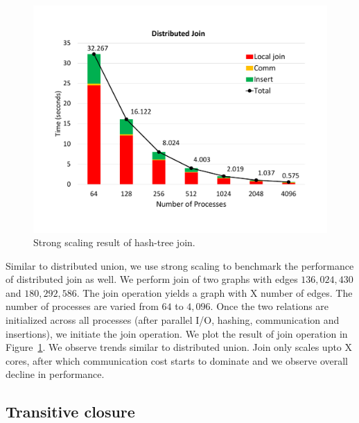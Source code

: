 \begin{figure}[h]
	\includegraphics[width=\columnwidth]{results/join.pdf}
	\caption{Strong scaling result of hash-tree join.}
	\label{fig:dist_join}
\end{figure}



Similar to distributed union, we use strong scaling to benchmark the performance of distributed join as well.
We perform join of two graphs with edges $136,024,430$ and $180,292,586$. The join operation yields a graph with X number of edges.
The number of processes are varied from $64$ to $4,096$. 
Once the two relations are initialized across all processes (after parallel I/O, hashing, communication and insertions), we initiate the join operation. 
We plot the result of join operation in Figure~\ref{fig:dist_join}. We observe trends similar to distributed union.
Join only scales upto X cores, after which communication cost starts to dominate and we observe overall decline in performance.


\subsection{Transitive closure}
\label{sec:tc}

